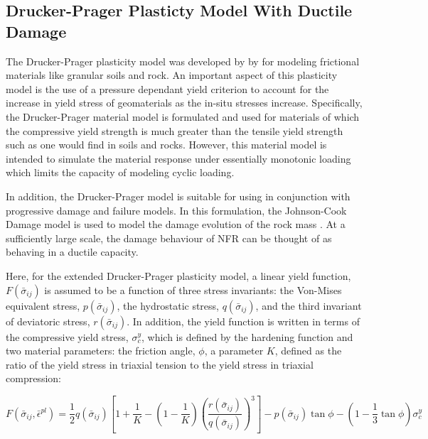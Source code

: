 \subsection{Drucker-Prager Plasticty Model With Ductile Damage}
The Drucker-Prager plasticity model was developed by by \citet{drucker_implications_1950} for modeling frictional materials like granular soils and rock. An important aspect of this plasticity model is the use of a pressure dependant yield criterion to account for the increase in yield stress of geomaterials as the in-situ stresses increase. Specifically, the Drucker-Prager material model is formulated and used for materials of which the compressive yield strength is much greater than the tensile yield strength such as one would find in soils and rocks. However, this material model is intended to simulate the material response under essentially monotonic loading which limits the capacity of modeling cyclic loading.

In addition, the Drucker-Prager model is suitable for using in conjunction with progressive damage and failure models. In this formulation, the Johnson-Cook Damage model is used to model the damage evolution of the rock mass \cite{johnson_fracture_1985}. At a sufficiently large scale, the damage behaviour of NFR can be thought of as behaving in a ductile capacity. 

Here, for the extended Drucker-Prager plasticity model, a linear yield function, $F\left(\bar{\sigma}_{ij}\right)$ is assumed to be a function of three stress invariants: the Von-Mises equivalent stress, $p\left(\bar{\sigma}_{ij}\right)$, the hydrostatic stress, $q\left(\bar{\sigma}_{ij}\right)$, and the third invariant of deviatoric stress, $r\left(\bar{\sigma}_{ij}\right)$. In addition, the yield function is written in terms of the compressive yield stress, $\sigma_c^y$, which is defined by the hardening function and two material parameters: the friction angle, $\phi$, a parameter $K$, defined as the ratio of the yield stress in triaxial tension to the yield stress in triaxial compression:

\begin{equation}
F\left(\bar{\sigma}_{ij}, \bar{\epsilon}^{pl}\right)=\frac{1}{2}q\left(\bar{\sigma}_{ij}\right)\left [ 1+\frac{1}{K}-\left ( 1-\frac{1}{K} \right )\left ( \frac{r\left(\bar{\sigma}_{ij}\right)}{q\left(\bar{\sigma}_{ij}\right)} \right )^3 \right ]-p\left(\bar{\sigma}_{ij}\right)\tan\phi - \left(1-\frac{1}{3}\tan\phi \right)\sigma_c^y
\label{eqn:const8c}
\end{equation}

